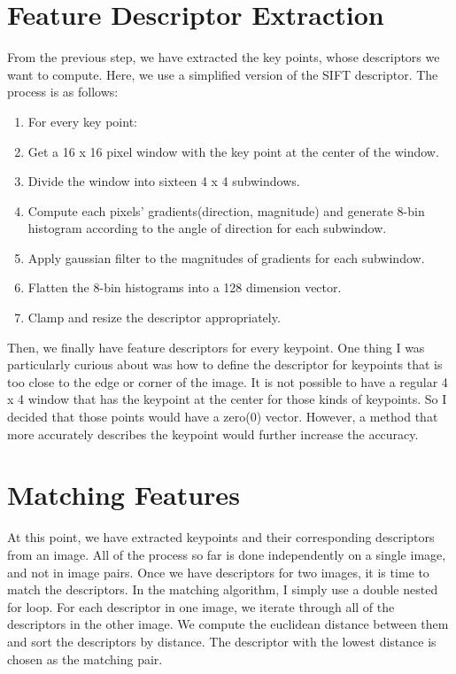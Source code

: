 \section*{Feature Descriptor Extraction}
From the previous step, we have extracted the key points, whose descriptors we want to compute. Here, we use a simplified version of the SIFT descriptor. The process is as follows:

\begin{enumerate}
    \item For every key point:
    \item Get a 16 x 16 pixel window with the key point at the center of the window.
    \item Divide the window into sixteen 4 x 4 subwindows.
    \item Compute each pixels' gradients(direction, magnitude) and generate 8-bin histogram according to the angle of direction for each subwindow.
    \item Apply gaussian filter to the magnitudes of gradients for each subwindow.
    \item Flatten the 8-bin histograms into a 128 dimension vector.
    \item Clamp and resize the descriptor appropriately.
\end{enumerate}

Then, we finally have feature descriptors for every keypoint. One thing I was particularly curious about was how to define the descriptor for keypoints that is too close to the edge or corner of the image. It is not possible to have a regular 4 x 4 window that has the keypoint at the center for those kinds of keypoints. So I decided that those points would have a zero(0) vector. However, a method that more accurately describes the keypoint would further increase the accuracy.

\section*{Matching Features}
At this point, we have extracted keypoints and their corresponding descriptors from an image. All of the process so far is done independently on a single image, and not in image pairs. Once we have descriptors for two images, it is time to match the descriptors. In the matching algorithm, I simply use a double nested for loop. For each descriptor in one image, we iterate through all of the descriptors in the other image. We compute the euclidean distance between them and sort the descriptors by distance. The descriptor with the lowest distance is chosen as the matching pair.

